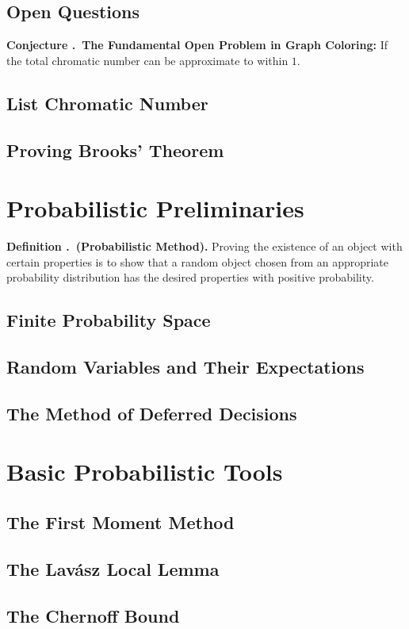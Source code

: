 \documentclass[12pt, letterpaper]{article}
\newcounter{index}[subsection]
\newenvironment*{df}[1]{\par\noindent\textbf{Definition \thesection.\stepcounter{index}\theindex\ (#1).}}{\par}
\newenvironment*{conj}[1]{\par\noindent\textbf{Conjecture \thesection.\stepcounter{index}\theindex\ #1:}}{\par}
\begin{document}
\subsection{Open Questions}
\begin{conj}{The Fundamental Open Problem in Graph Coloring}
	If the total chromatic number can be approximate to within $1$. 	
\end{conj}

\subsection{List Chromatic Number}
\subsection{Proving Brooks' Theorem}\label{sec:provingBrook}

\newpage
\section{Probabilistic Preliminaries}
\begin{df}{Probabilistic Method}
	Proving the existence of an object with certain properties is to show that a random object chosen from an appropriate probability distribution has the desired properties with positive probability. 	
\end{df}

\subsection{Finite Probability Space}
\subsection{Random Variables and Their Expectations}
\subsection{The Method of Deferred Decisions}

\newpage
\section{Basic Probabilistic Tools}
\subsection{The First Moment Method}
\subsection{The Lav\'asz Local Lemma}
\subsection{The Chernoff Bound}
\end{document}
